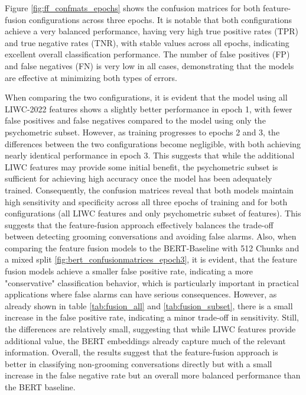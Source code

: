 Figure \ref{fig:ff_confmats_epochs} shows the confusion matrices for both feature-fusion configurations across three epochs. It is notable that both configurations achieve a very balanced performance, having very high true positive rates (TPR) and true negative rates (TNR), with stable values across all epochs, indicating excellent overall classification performance. The number of false positives (FP) and false negatives (FN) is very low in all cases, demonstrating that the models are effective at minimizing both types of errors. 

When comparing the two configurations, it is evident that the model using all LIWC-2022 features shows a slightly better performance in epoch 1, with fewer false positives and false negatives compared to the model using only the psychometric subset. However, as training progresses to epochs 2 and 3, the differences between the two configurations become negligible, with both achieving nearly identical performance in epoch 3. This suggests that while the additional LIWC features may provide some initial benefit, the psychometric subset is sufficient for achieving high accuracy once the model has been adequately trained. Consequently, the confusion matrices reveal that both models maintain high sensitivity and specificity across all three epochs of training and for both configurations (all LIWC features and only psychometric subset of features). This suggests that the feature-fusion approach effectively balances the trade-off between detecting grooming conversations and avoiding false alarms. Also, when comparing the feature fusion models to the BERT-Baseline with 512 Chunks and a mixed split \ref{fig:bert_confusionmatrices_epoch3}, it is evident, that the feature fusion models achieve a smaller false positive rate, indicating a more "conservative" classification behavior, which is particularly important in practical applications where false alarms can have serious consequences. However, as already shown in table \ref{tab:fusion_all} and \ref{tab:fusion_subset}, there is a small increase in the false positive rate, indicating a minor trade-off in sensitivity. Still, the differences are relatively small, suggesting that while LIWC features provide additional value, the BERT embeddings already capture much of the relevant information. Overall, the results suggest that the feature-fusion approach is better in classifying non-grooming conversations directly but with a small increase in the false negative rate but an overall more balanced performance than the BERT baseline.


